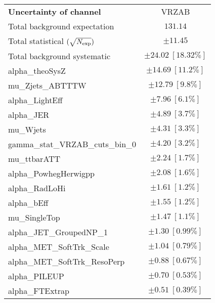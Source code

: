 
\begin{table}
\begin{center}
\setlength{\tabcolsep}{0.0pc}
\begin{tabular*}{\textwidth}{@{\extracolsep{\fill}}lc}
\noalign{\smallskip}\hline\noalign{\smallskip}
{\bf Uncertainty of channel}                                    & VRZAB            \\
\noalign{\smallskip}\hline\noalign{\smallskip}
Total background expectation             &  $131.14$       \\
\noalign{\smallskip}\hline\noalign{\smallskip}
Total statistical $(\sqrt{N_{\rm exp}})$              & $\pm 11.45$       \\
Total background systematic               & $\pm 24.02\ [18.32\%] $             \\
\noalign{\smallskip}\hline\noalign{\smallskip}
\noalign{\smallskip}\hline\noalign{\smallskip}
alpha\_theoSysZ         & $\pm 14.69\ [11.2\%] $       \\
mu\_Zjets\_ABTTTW         & $\pm 12.79\ [9.8\%] $       \\
alpha\_LightEff         & $\pm 7.96\ [6.1\%] $       \\
alpha\_JER         & $\pm 4.89\ [3.7\%] $       \\
mu\_Wjets         & $\pm 4.31\ [3.3\%] $       \\
gamma\_stat\_VRZAB\_cuts\_bin\_0         & $\pm 4.20\ [3.2\%] $       \\
mu\_ttbarATT         & $\pm 2.24\ [1.7\%] $       \\
alpha\_PowhegHerwigpp         & $\pm 2.08\ [1.6\%] $       \\
alpha\_RadLoHi         & $\pm 1.61\ [1.2\%] $       \\
alpha\_bEff         & $\pm 1.55\ [1.2\%] $       \\
mu\_SingleTop         & $\pm 1.47\ [1.1\%] $       \\
alpha\_JET\_GroupedNP\_1         & $\pm 1.30\ [0.99\%] $       \\
alpha\_MET\_SoftTrk\_Scale         & $\pm 1.04\ [0.79\%] $       \\
alpha\_MET\_SoftTrk\_ResoPerp         & $\pm 0.88\ [0.67\%] $       \\
alpha\_PILEUP         & $\pm 0.70\ [0.53\%] $       \\
alpha\_FTExtrap         & $\pm 0.51\ [0.39\%] $       \\

\end{tabular*}
\end{center}
\end{table}
